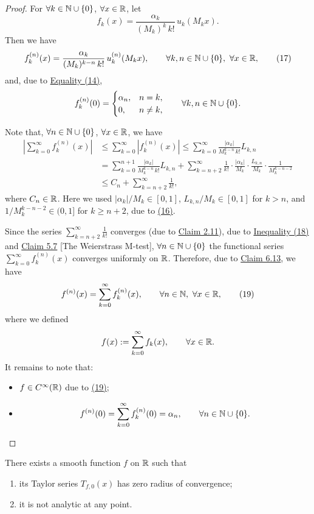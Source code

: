 \begin{proof}
For $\forall k\in\mathbb{N}\cup\{0\}$, $\forall x\in\mathbb{R}$, let
\[
f_k(x)=\frac{\alpha_k}{(M_k)^k\,k!}\,u_k(M_kx).
\]
Then we have
\[
f_k^{(n)}(x)
=\frac{\alpha_k}{(M_k)^{k-n}\,k!}\,u_k^{(n)}(M_kx),
\qquad \forall k,n\in\mathbb{N}\cup\{0\},\ \forall x\in\mathbb{R},
\tag{17}\label{eq:8:17:1}
\]
and, due to \hyperref[eq:8:14:1]{Equality (14)},
\[
f_k^{(n)}(0)=
\begin{cases}
\alpha_n,&n=k,\\0,&n\neq k,
\end{cases}
\qquad \forall k,n\in\mathbb{N}\cup\{0\}.
\]

Note that, $\forall n\in\mathbb{N}\cup\{0\}$, $\forall x\in\mathbb{R}$, we have
\begin{align*}
\left|\sum_{k=0}^{\infty}f_k^{(n)}(x)\right|
&\leq\sum_{k=0}^{\infty}|f_k^{(n)}(x)|
\leq\sum_{k=0}^{\infty}\frac{|\alpha_k|}{M_k^{k-n}\,k!}L_{k,n}\\
&=\sum_{k=0}^{n+1}\frac{|\alpha_k|}{M_k^{k-n}\,k!}L_{k,n}
+\sum_{k=n+2}^{\infty}\frac1{k!}\cdot\frac{|\alpha_k|}{M_k}\cdot\frac{L_{k,n}}{M_k}\cdot\frac1{M_k^{k-n-2}}\\
&\leq C_n+\sum_{k=n+2}^{\infty}\frac1{k!},
\tag{18}\label{eq:8:18:1}
\end{align*}
where $C_n\in\mathbb{R}$.
Here we used $|\alpha_k|/M_k\in[0,1]$, $L_{k,n}/M_k\in[0,1]$ for $k>n$, and $1/M_k^{k-n-2}\in(0,1]$ for $k\geq n+2$, due to \hyperref[eq:8:16:1]{(16)}.

Since the series $\sum_{k=n+2}^{\infty}\frac1{k!}$ converges (due to \hyperref[claim:2.11]{Claim 2.11}), due to \hyperref[eq:8:18:1]{Inequality (18)} and \hyperref[claim:5.7]{Claim 5.7} [The Weierstrass M-test], $\forall n\in\mathbb{N}\cup\{0\}$ the functional series $\sum_{k=0}^{\infty}f_k^{(n)}(x)$ converges uniformly on $\mathbb{R}$.
Therefore, due to \hyperref[claim:6.13]{Claim 6.13}, we have
\[
f^{(n)}(x)=\sum_{k=0}^{\infty}f_k^{(n)}(x),
\qquad \forall n\in\mathbb{N},\ \forall x\in\mathbb{R},
\tag{19}\label{eq:8:19:1}
\]
where we defined
\[
f(x):=\sum_{k=0}^{\infty}f_k(x),
\qquad \forall x\in\mathbb{R}.
\]
It remains to note that:
\begin{itemize}
    \item $f\in C^\infty(\mathbb{R})$ due to \hyperref[eq:8:19:1]{(19)};
    \item
    \[
    f^{(n)}(0)=\sum_{k=0}^{\infty}f_k^{(n)}(0)=\alpha_n,
    \qquad \forall n\in\mathbb{N}\cup\{0\}.
    \]
\end{itemize}
\end{proof}

\begin{claim}\label{claim:8.7}
There exists a smooth function $f$ on $\mathbb{R}$ such that
\begin{enumerate}
    \item\label{item:claim:8.7:1} its Taylor series $T_{f,0}(x)$ has zero radius of convergence;
    \item\label{item:claim:8.7:2} it is not analytic at any point.
\end{enumerate}
\end{claim}

